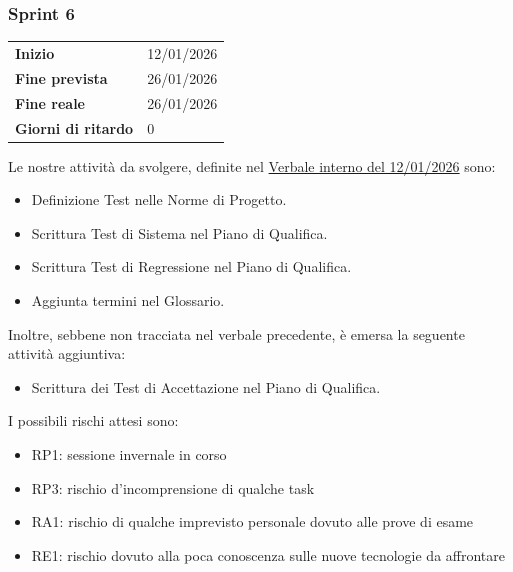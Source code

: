 \subsubsection{Sprint 6}


\begin{tabular}{p{} p{}}
	\textbf{Inizio} & 12/01/2026 \\
	\textbf{Fine prevista} & 26/01/2026 \\
	\textbf{Fine reale} &  26/01/2026 \\
	\textbf{Giorni di ritardo} & 0
\end{tabular}
\newline \newline 
Le nostre attività da svolgere, definite nel \href{https://nullpointersgroup.github.io/Documentazione/output/RTB/Verbali%20Interni/2026-01-12_verbale_interno.pdf}{Verbale interno del 12/01/2026} sono:
\begin{itemize}[itemsep=5pt, parsep=1pt, label=$\scriptstyle\bullet$]
    \item Definizione Test nelle Norme di Progetto.
    \item Scrittura Test di Sistema nel Piano di Qualifica.
    \item Scrittura Test di Regressione nel Piano di Qualifica.
    \item Aggiunta termini nel Glossario.
\end{itemize}
Inoltre, sebbene non tracciata nel verbale precedente, è emersa la seguente attività aggiuntiva:
\begin{itemize}
	\item Scrittura dei Test di Accettazione nel Piano di Qualifica.
\end{itemize}

I possibili rischi attesi sono:
\begin{itemize}[itemsep=5pt, parsep=1pt, label=$\scriptstyle\bullet$]
	\item RP1: sessione invernale in corso 
	\item RP3: rischio d'incomprensione di qualche task
	\item RA1: rischio di qualche imprevisto personale dovuto alle prove di esame
	\item RE1: rischio dovuto alla poca conoscenza sulle nuove tecnologie da affrontare
\end{itemize}

